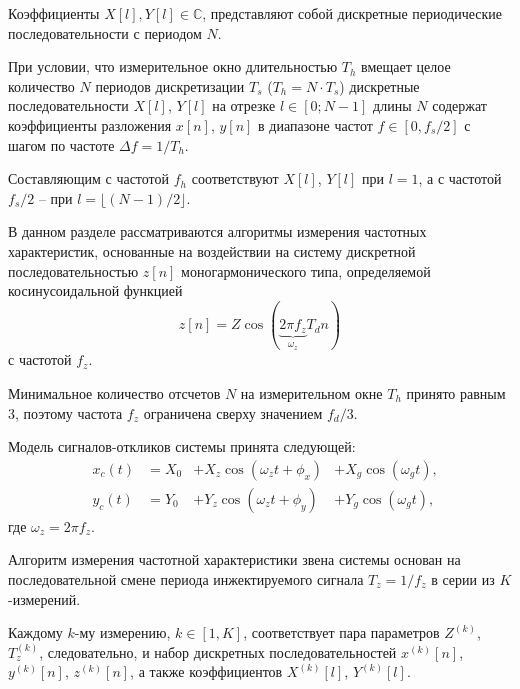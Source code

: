 Коэффициенты ${X\left[l\right], Y\left[l\right] \in \mathbb{C}}$, представляют собой дискретные периодические последовательности с периодом $N$.

При условии, что измерительное окно длительностью ${T_{h}}$ вмещает целое количество $N$ периодов дискретизации ${T_{s}}$ (${T_{h} = N \cdot T_{s}}$) дискретные последовательности ${X\left[l\right]}$, ${Y\left[l\right]}$ на отрезке ${l \in \left[0; N - 1 \right]}$ длины $N$ содержат коэффициенты разложения ${x\left[n\right]}$, ${y\left[n\right]}$ в диапазоне частот ${f \in \left[0, f_{s} / 2\right]}$ с шагом по частоте ${\Delta f=1 / T_{h}}$.

Составляющим с частотой ${f_{h}}$ соответствуют ${X\left[l\right]}$, ${Y\left[l\right]}$ при ${l = 1}$, а с частотой ${f_{s} / 2}$ -- при ${l = \bigl \lfloor (N - 1)/2 \bigr \rfloor}$.

В данном разделе рассматриваются алгоритмы измерения частотных характеристик, основанные на воздействии на систему дискретной последовательностью ${z[n]}$ моногармонического типа, определяемой косинусоидальной функцией
\begin{equation*}
    z[n] = Z \cos{(\underbrace{2\pi f_{z}}_{\omega_{z}} T_{d} n )}
\end{equation*}
с частотой ${f_{z}}$.

Минимальное количество отсчетов $N$ на измерительном окне ${T_{h}}$ принято равным 3, поэтому частота ${f_{z}}$ ограничена сверху значением ${f_{d} / 3}$.

Модель сигналов-откликов системы принята следующей:
\begin{equation*}
    \begin{aligned}
        &x_c(t) &= X_0 &+ X_{z} \cos{\left(\omega_{z} t + \phi_{x} \right)} &+ X_{g} \cos{\left(\omega_{g} t\right)}, \\
        &y_c(t) &= Y_0 &+ Y_{z} \cos{\left(\omega_{z} t + \phi_{y} \right)} &+ Y_{g} \cos{\left(\omega_{g} t\right)},
    \end{aligned}
\end{equation*}
где ${\omega_{z} = 2\pi f_{z}}$.

Алгоритм измерения частотной характеристики звена системы основан на последовательной смене периода инжектируемого сигнала ${T_{z} = 1 / f_{z}}$ в серии из $K$-измерений.

Каждому $k$-му измерению, ${k \in \left[1, K\right]}$, соответствует пара параметров $Z^{(k)}$, ${T^{(k)}_{z}}$, следовательно, и набор дискретных последовательностей ${x^{(k)}[n]}$, ${y^{(k)}[n]}$, ${z^{(k)}[n]}$, а также коэффициентов ${X^{(k)}\left[l\right]}$, ${Y^{(k)}\left[l\right]}$.

